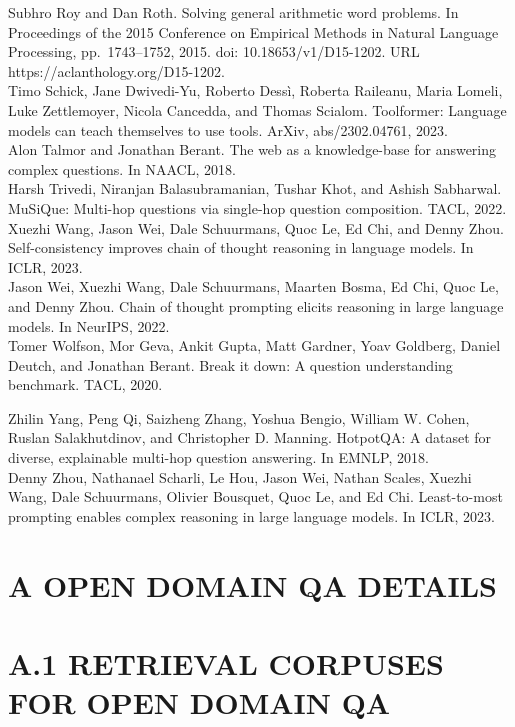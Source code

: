 \documentclass[
]{article}
\begin{document}
Subhro Roy and Dan Roth. Solving general arithmetic word problems. In
Proceedings of the 2015 Conference on Empirical Methods in Natural
Language Processing, pp.~1743--1752, 2015. doi: 10.18653/v1/D15-1202.
URL https://aclanthology.org/D15-1202.\\
Timo Schick, Jane Dwivedi-Yu, Roberto Dessì, Roberta Raileanu, Maria
Lomeli, Luke Zettlemoyer, Nicola Cancedda, and Thomas Scialom.
Toolformer: Language models can teach themselves to use tools. ArXiv,
abs/2302.04761, 2023.\\
Alon Talmor and Jonathan Berant. The web as a knowledge-base for
answering complex questions. In NAACL, 2018.\\
Harsh Trivedi, Niranjan Balasubramanian, Tushar Khot, and Ashish
Sabharwal. MuSiQue: Multi-hop questions via single-hop question
composition. TACL, 2022.\\
Xuezhi Wang, Jason Wei, Dale Schuurmans, Quoc Le, Ed Chi, and Denny
Zhou. Self-consistency improves chain of thought reasoning in language
models. In ICLR, 2023.\\
Jason Wei, Xuezhi Wang, Dale Schuurmans, Maarten Bosma, Ed Chi, Quoc Le,
and Denny Zhou. Chain of thought prompting elicits reasoning in large
language models. In NeurIPS, 2022.\\
Tomer Wolfson, Mor Geva, Ankit Gupta, Matt Gardner, Yoav Goldberg,
Daniel Deutch, and Jonathan Berant. Break it down: A question
understanding benchmark. TACL, 2020.

Zhilin Yang, Peng Qi, Saizheng Zhang, Yoshua Bengio, William W. Cohen,
Ruslan Salakhutdinov, and Christopher D. Manning. HotpotQA: A dataset
for diverse, explainable multi-hop question answering. In EMNLP, 2018.\\
Denny Zhou, Nathanael Scharli, Le Hou, Jason Wei, Nathan Scales, Xuezhi
Wang, Dale Schuurmans, Olivier Bousquet, Quoc Le, and Ed Chi.
Least-to-most prompting enables complex reasoning in large language
models. In ICLR, 2023.

\section{A OPEN DOMAIN QA DETAILS}\label{a-open-domain-qa-details}

\section{A.1 RETRIEVAL CORPUSES FOR OPEN DOMAIN
QA}\label{a.1-retrieval-corpuses-for-open-domain-qa}
\end{document}
